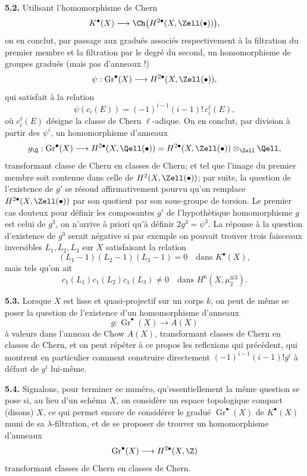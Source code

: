 \textbf{5.2.} Utilisant l'homomorphisme de Chern
\[
 K^\bullet(X)\longrightarrow\Ch\bigl(H^{2\bullet}(X,\Zell(\bullet))\bigr),
\]
on en conclut, par passage aux gradués associés respectivement à la filtration du premier membre et la filtration par le degré du second, un homomorphisme de groupes gradués (mais pas d'anneaux !)
\[
 \psi:\operatorname{Gr}^\bullet(X)\longrightarrow H^{2\bullet}(X,\Zell(\bullet)),
\]
qui satisfait à la relation
\[
 \psi(c_i(E))=(-1)^{i-1}(i-1)!\,c_i^\ell(E),
\]
où $c_i^\ell(E)$ désigne la classe de Chern $\ell$-adique. On en conclut, par division à partir des $\psi^i$, un homomorphisme d'anneaux
\[
 g_\Q:\operatorname{Gr}^\bullet(X)\longrightarrow
 H^{2\bullet}(X,\Qell(\bullet))=
 H^{2\bullet}(X,\Zell(\bullet))\otimes_{\Zell}\Qell,
\]
transformant classe de Chern en classes de Chern; et tel que l'image du premier membre soit contenue dans celle de $H^2(X,\Zell(\bullet))$; par suite, la question de l'existence de $g'$ se résoud affirmativement pourvu qu'on remplace $H^{2\bullet}(X,\Zell(\bullet))$ par son quotient par son sous-groupe de torsion. Le premier cas douteux pour définir les composantes $g^i$ de l'hypothètique homomorphisme $g$ est celui de $g^3$, on n'arrive à priori qu'à définir $2g^3=\psi^3$. La réponse à la question d'existence de $g^3$ serait négative si par exemple on pouvait trouver trois faisceaux inversibles $L_1,L_2,L_3$ sur $X$ satisfaisant la relation
\[
 (L_1-1)(L_2-1)(L_3-1)=0\quad\text{dans }K^\bullet(X),
\]
mais tels qu'on ait
\[
 c_1(L_1)c_1(L_2)c_1(L_3)\ne0
 \quad\text{dans }H^6(X,\mu_2^{\otimes3}).
\]

\textbf{5.3.} Lorsque $X$ est lisse et quasi-projectif sur un corps $k$, on peut de même se poser la question de l'existence d'un homomorphisme d'anneaux
\[
 g:\operatorname{Gr}^\bullet(X)\longrightarrow A(X)
\]
à valeurs dans l'anneau de Chow $A(X)$, transformant classes de Chern en classes de Chern, et on peut répéter à ce propos les reflexions qui précèdent, qui montrent en particulier comment construire directement $(-1)^{i-1}(i-1)!g^i$ à défaut de $g^i$ lui-même.

\textbf{5.4.} Signalons, pour terminer ce numéro, qu'essentiellement la même question se pose si, au lieu d'un schéma $X$, on considère un espace topologique compact (disons) $X$, ce qui permet encore de considérer le gradué $\operatorname{Gr}^\bullet(X)$ de $K^\bullet(X)$ muni de sa $\lambda$-filtration, et de se proposer de trouver un homomorphisme d'anneaux
\[
 \operatorname{Gr}^\bullet(X)\longrightarrow H^{2\bullet}(X,\Z)
\]
transformant classes de Chern en classes de Chern.

